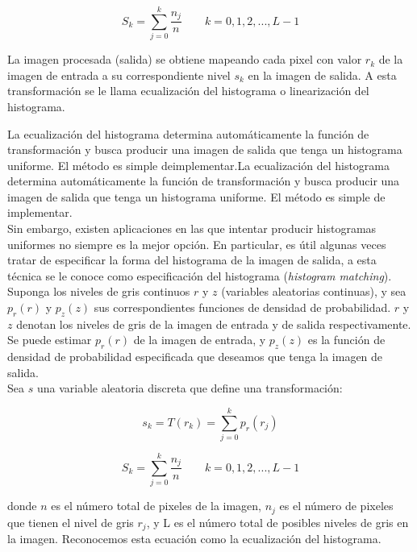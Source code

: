 \documentclass{article}
\begin{document}
\begin{equation}
S_{k}=\sum \limits_{j=0}^{k} \frac{n_{j}}{n} \qquad k=0,1,2,...,L-1
\label{eq:1} 
\end{equation}

La imagen procesada (salida) se obtiene mapeando cada pixel con valor $r_{k}$ de la imagen de entrada a su correspondiente nivel $s_{k}$ en la imagen de salida. A esta transformación se le llama ecualización del histograma o linearización del histograma. 

La ecualización del histograma determina automáticamente la función de transformación y busca 
producir una imagen de salida que tenga un histograma uniforme. El método es simple deimplementar.La ecualización del histograma determina automáticamente la función de transformación y busca producir una imagen de salida que tenga un histograma uniforme. El método es simple de implementar.\\

Sin embargo, existen aplicaciones en las que intentar producir histogramas uniformes no siempre es la mejor opción. En particular, es útil algunas veces tratar de especificar la forma del histograma de la imagen de salida, a esta técnica se le conoce como especificación del 
histograma (\emph{histogram matching}).\\

Suponga los niveles de gris continuos $r$ y $z$ (variables aleatorias continuas), y sea $p_{r}(r)$ y $p_{z}(z)$ sus correspondientes funciones de densidad de probabilidad. $r$ y $z$ denotan los niveles de gris de la imagen de entrada y de salida respectivamente.\\

Se puede estimar $p_{r}(r)$ de la imagen de entrada, y $p_{z}(z)$ es la función de densidad de probabilidad especificada que deseamos que tenga la imagen de salida.\\

Sea $s$ una variable aleatoria discreta que define una transformación:

\begin{equation}
s_{k}=T(r_{k})=\sum \limits_{j=0}^{k} p_{r}(r_{j})
\end{equation}

\begin{equation}
S_{k}=\sum \limits_{j=0}^{k} \frac{n_{j}}{n} \qquad k=0,1,2,...,L-1
\end{equation}

donde $n$ es el número total de pixeles de la imagen, $n_{j}$ es el número de pixeles que tienen el nivel de gris $r_{j}$, y L es el número total de posibles niveles de gris en la imagen. Reconocemos esta ecuación como la ecualización del histograma.\\
\end{document}

